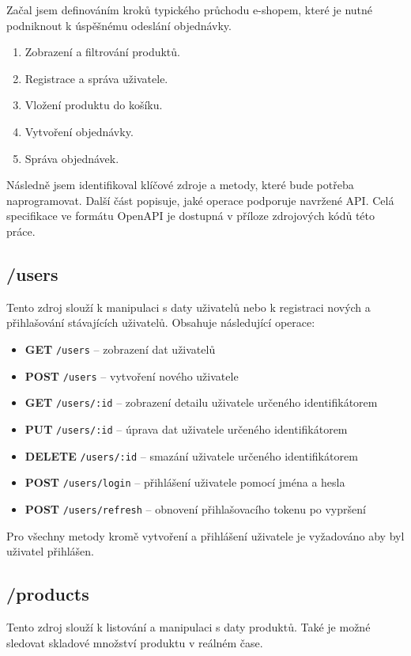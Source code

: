 \documentclass[thesis=M,czech]{FITthesis}[2019/12/23]
\begin{document}
Začal jsem definováním kroků typického průchodu e-shopem, které je nutné podniknout k úspěšnému odeslání objednávky.

\begin{enumerate}
  \item Zobrazení a filtrování produktů.
  \item Registrace a správa uživatele.
  \item Vložení produktu do košíku.
  \item Vytvoření objednávky.
  \item Správa objednávek.
\end{enumerate}

Následně jsem identifikoval klíčové zdroje a metody, které bude potřeba naprogramovat. Další část popisuje, jaké operace podporuje navržené API. Celá specifikace ve formátu OpenAPI je dostupná v příloze zdrojových kódů této práce.

\subsection{/users}
Tento zdroj slouží k manipulaci s daty uživatelů nebo k registraci nových a přihlašování stávajících uživatelů. Obsahuje následující operace:

\begin{itemize}
  \item \textbf{GET} \texttt{/users}  -- zobrazení dat uživatelů
  \item \textbf{POST} \texttt{/users}  -- vytvoření nového uživatele
  \item \textbf{GET} \texttt{/users/:id} -- zobrazení detailu uživatele určeného identifikátorem
  \item \textbf{PUT} \texttt{/users/:id} -- úprava dat uživatele určeného identifikátorem
  \item \textbf{DELETE} \texttt{/users/:id}  -- smazání uživatele určeného identifikátorem
  \item \textbf{POST} \texttt{/users/login} -- přihlášení uživatele pomocí jména a hesla
  \item \textbf{POST} \texttt{/users/refresh} -- obnovení přihlašovacího tokenu po vypršení
\end{itemize}

Pro všechny metody kromě vytvoření a přihlášení uživatele je vyžadováno aby byl uživatel přihlášen.

\subsection{/products}
Tento zdroj slouží k listování a manipulaci s daty produktů. Také je možné sledovat skladové množství produktu v reálném čase.
\end{document}
